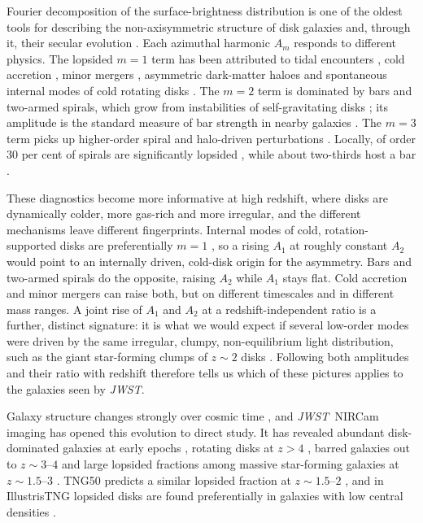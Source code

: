 \documentclass[fleqn,usenatbib]{mnras}
\newcommand{\JWST}{\textit{JWST}}
\begin{document}
Fourier decomposition of the surface-brightness distribution is one of the
oldest tools for describing the non-axisymmetric structure of disk galaxies and,
through it, their secular evolution \citep{Rix1995,Zaritsky1997,Jog2009}. Each
azimuthal harmonic $A_m$ responds to different physics. The lopsided $m=1$ term
has been attributed to tidal encounters \citep{Combes2004,Walker1996}, cold
accretion \citep{Bournaud2005,Dekel2009,Dekel2020}, minor mergers
\citep{Zaritsky1997,Angiras2006}, asymmetric dark-matter haloes
\citep{Noordermeer2001,Ghosh2022} and spontaneous internal modes of cold
rotating disks \citep{Jog1997,Jog1999,Saha2007,2011Ap.....54..184M,2025A&AT...35..215O}.
The $m=2$ term is dominated by bars and two-armed spirals, which grow from
instabilities of self-gravitating disks
\citep{Athanassoula2003,Debattista2000,Sellwood2014}; its amplitude is the
standard measure of bar strength in nearby galaxies \citep{DiazGarcia2016}. The
$m=3$ term picks up higher-order spiral and halo-driven perturbations
\citep{Dubinski2008}. Locally, of order 30 per cent of spirals are significantly
lopsided \citep{Zaritsky1997,Reichard2008,Zaritsky2013}, while about two-thirds
host a bar \citep{Buta2015,Erwin2018}.

These diagnostics become more informative at high redshift, where disks are
dynamically colder, more gas-rich and more irregular, and the different
mechanisms leave different fingerprints. Internal modes of cold,
rotation-supported disks are preferentially $m=1$ \citep{Jog1997,Saha2007}, so a
rising $A_1$ at roughly constant $A_2$ would point to an internally driven,
cold-disk origin for the asymmetry. Bars and two-armed spirals do the opposite,
raising $A_2$ while $A_1$ stays flat. Cold accretion and minor mergers can raise
both, but on different timescales and in different mass ranges. A joint rise of
$A_1$ and $A_2$ at a redshift-independent ratio is a further, distinct
signature: it is what we would expect if several low-order modes were driven by
the same irregular, clumpy, non-equilibrium light distribution, such as the
giant star-forming clumps of $z\sim2$ disks
\citep{Elmegreen2007,ForsterSchreiber2009,Genzel2011}. Following both amplitudes
and their ratio with redshift therefore tells us which of these pictures applies
to the galaxies seen by \JWST.

Galaxy structure changes strongly over cosmic time \citep{Conselice2014},
and \JWST\ NIRCam imaging \citep{Gardner2023,Rieke2023} has opened this
evolution to direct study. It has revealed abundant disk-dominated galaxies at
early epochs
\citep{Ferreira2022,Ferreira2023,Jacobs2023,Kartaltepe2023,Robertson2023,%
2024A&A...682L..17X,Vega-Ferrero2024,Huertas2023}, rotating disks at $z>4$
\citep{Smit2018,Neeleman2020,Rizzo2021,Lelli2021,Nelson2024,Rowland2024,Posses2024},
barred galaxies out to $z\sim3$--$4$
\citep{Costantin2023,Guo2023,Guo2025,LeConte2024} and large lopsided fractions
among massive star-forming galaxies at $z\sim1.5$--$3$ \citep{LeBail2024}. TNG50
predicts a similar lopsided fraction at $z\sim1.5$--$2$ \citep{Jimenez2025}, and
in IllustrisTNG lopsided disks are found preferentially in galaxies with low
central densities \citep{Lokas2022,VarelaLavin2023}.
\end{document}
